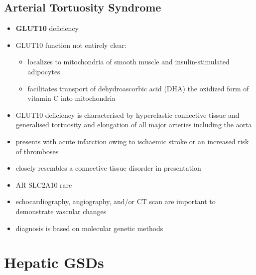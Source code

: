 \documentclass{scrartcl}
\begin{document}
\subsection{Arterial Tortuosity Syndrome}
\label{sec:orgb9bd0ef}
\begin{itemize}
\item \textbf{GLUT10} deficiency
\item GLUT10 function not entirely clear:
\begin{itemize}
\item localizes to mitochondria of smooth muscle and insulin-stimulated adipocytes
\item facilitates transport of dehydroascorbic acid (DHA) the
oxidized form of vitamin C into mitochondria
\end{itemize}
\item GLUT10 deficiency is characterised by hyperelastic connective tissue
and generalised tortuosity and elongation of all major arteries
including the aorta
\item presents with acute infarction owing to ischaemic stroke or an
increased risk of thromboses
\item closely resembles a connective tissue disorder in presentation
\item AR SLC2A10 rare
\item echocardiography, angiography, and/or CT scan are important to demonstrate vascular changes
\item diagnosis is based on molecular genetic methods
\end{itemize}
\section{Hepatic GSDs}
\label{sec:orgd81e257}
\end{document}
